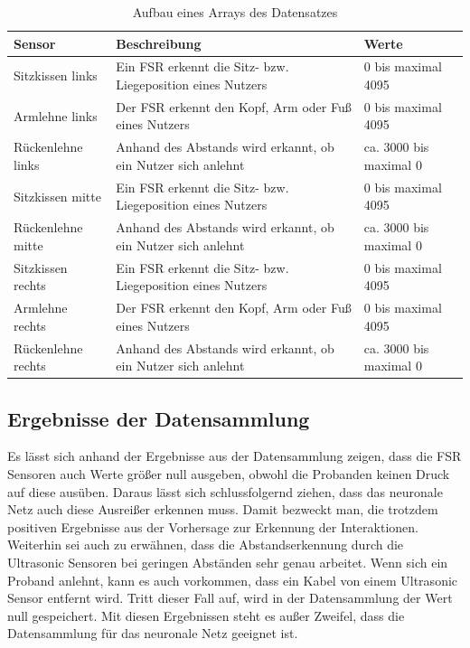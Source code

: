 \begin{table}[H]
	\centering
	\caption[Aufbau eines Arrays des Datensatzes]{Aufbau eines Arrays des Datensatzes}
		\vspace{1.0em}	
	\begin{tabular}{| l | p{5cm} | l | }
		\hline
		\rowcolor[gray]{0.9}\textbf{Sensor} & \textbf{Beschreibung} & \textbf{Werte} \\
		\hline
		\hline
		Sitzkissen links & Ein FSR erkennt die Sitz- bzw. Liegeposition eines Nutzers & 0 bis maximal 4095\\
		\hline
		Armlehne links & Der FSR erkennt den Kopf, Arm oder Fuß eines Nutzers & 0 bis maximal 4095\\
		\hline
		Rückenlehne links & Anhand des Abstands wird erkannt, ob ein Nutzer sich anlehnt & ca. 3000 bis maximal 0 \\
		\hline
		Sitzkissen mitte & Ein FSR erkennt die Sitz- bzw. Liegeposition eines Nutzers & 0 bis maximal 4095\\
		\hline
		Rückenlehne mitte & Anhand des Abstands wird erkannt, ob ein Nutzer sich anlehnt & ca. 3000 bis maximal 0\\
		\hline
		Sitzkissen rechts & Ein FSR erkennt die Sitz- bzw. Liegeposition eines Nutzers & 0 bis maximal 4095\\
		\hline
		Armlehne rechts & Der FSR erkennt den Kopf, Arm oder Fuß eines Nutzers & 0 bis maximal 4095\\
		\hline
		Rückenlehne rechts & Anhand des Abstands wird erkannt, ob ein Nutzer sich anlehnt & ca. 3000 bis maximal 0\\ 
		\hline
	\end{tabular}
	\label{tab:tablearr}
\end{table}

\subsection{Ergebnisse der Datensammlung}
Es lässt sich anhand der Ergebnisse aus der Datensammlung zeigen, dass die FSR Sensoren auch Werte größer null ausgeben, obwohl die Probanden keinen Druck auf diese ausüben. Daraus lässt sich schlussfolgernd ziehen, dass das neuronale Netz auch diese Ausreißer erkennen muss. Damit bezweckt man, die trotzdem positiven Ergebnisse aus der Vorhersage zur Erkennung der Interaktionen. Weiterhin sei auch zu erwähnen, dass die Abstandserkennung durch die Ultrasonic Sensoren bei geringen Abständen sehr genau arbeitet. Wenn sich ein Proband anlehnt, kann es auch vorkommen, dass ein Kabel von einem Ultrasonic Sensor entfernt wird. Tritt dieser Fall auf, wird in der Datensammlung der Wert null gespeichert. Mit diesen Ergebnissen steht es außer Zweifel, dass die Datensammlung für das neuronale Netz geeignet ist. 

